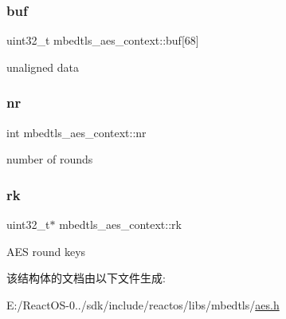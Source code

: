 \subsubsection{\texorpdfstring{buf}{buf}}
{\footnotesize\ttfamily uint32\+\_\+t mbedtls\+\_\+aes\+\_\+context\+::buf\mbox{[}68\mbox{]}}

unaligned data \mbox{\label{structmbedtls__aes__context_ad0b4f626fa3881c76f23a9a96812b69a}} 
\subsubsection{\texorpdfstring{nr}{nr}}
{\footnotesize\ttfamily int mbedtls\+\_\+aes\+\_\+context\+::nr}

number of rounds \mbox{\label{structmbedtls__aes__context_ac7e235e5b270daba3635f5e39949b7a4}} 
\subsubsection{\texorpdfstring{rk}{rk}}
{\footnotesize\ttfamily uint32\+\_\+t$\ast$ mbedtls\+\_\+aes\+\_\+context\+::rk}

A\+ES round keys 

该结构体的文档由以下文件生成\+:\begin{DoxyCompactItemize}
\item 
E\+:/\+React\+O\+S-\/0../sdk/include/reactos/libs/mbedtls/\hyperlink{aes_8h}{aes.\+h}\end{DoxyCompactItemize}
